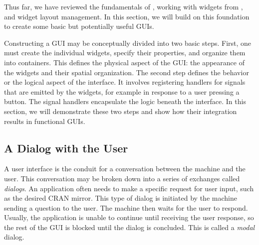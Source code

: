 \documentclass[article]{jss}
\begin{document}
Thus far, we have reviewed the fundamentals of , working with
 widgets from , and widget layout management. In this
section, we will build on this foundation to create some basic but potentially
useful GUIs. 

Constructing a GUI may be conceptually divided into two basic steps.
First, one must create the individual widgets, specify their properties,
and organize them into containers. This defines the physical aspect
of the GUI: the appearance of the widgets and their spatial organization.
The second step defines the behavior or the logical aspect of the
interface. It involves registering handlers for signals that are emitted
by the widgets, for example in response to a user pressing a button.
The signal handlers encapsulate the logic beneath the interface. In this
section, we will demonstrate these two steps and show how their integration
results in functional GUIs.

\subsection{A Dialog with the User}\label{sec:dialog-example}

A user interface is the conduit for a conversation between the machine and the
user. This conversation may be broken down into a series of exchanges called 
\emph{dialogs}. An application often needs to make a specific request
for user input, such as the desired CRAN mirror. This type of dialog is 
initiated by the machine sending a question to the user. The machine then
waits for the user to respond. Usually, the application is unable to continue
until receiving the user response, so the rest of the GUI is blocked until
the dialog is concluded. This is called a \emph{modal} dialog.
\end{document}
